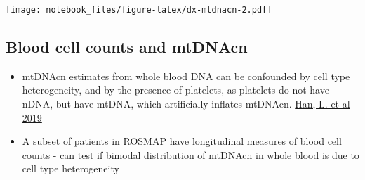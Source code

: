 \documentclass[]{book}
\newenvironment{Shaded}{\begin{snugshade}}{\end{snugshade}}
\newcommand{\DataTypeTok}[1]{\textcolor[rgb]{0.13,0.29,0.53}{#1}}
\newcommand{\DecValTok}[1]{\textcolor[rgb]{0.00,0.00,0.81}{#1}}
\newcommand{\KeywordTok}[1]{\textcolor[rgb]{0.13,0.29,0.53}{\textbf{#1}}}
\newcommand{\NormalTok}[1]{#1}
\newcommand{\OperatorTok}[1]{\textcolor[rgb]{0.81,0.36,0.00}{\textbf{#1}}}
\newcommand{\StringTok}[1]{\textcolor[rgb]{0.31,0.60,0.02}{#1}}
\providecommand{\tightlist}{%
  \setlength{\itemsep}{0pt}\setlength{\parskip}{0pt}}
\begin{document}
\begin{Shaded}
\end{Shaded}

\texttt{[image: notebook\_files/figure-latex/dx-mtdnacn-2.pdf]}

\hypertarget{blood-cell-counts-and-mtdnacn}{%
\subsection{Blood cell counts and mtDNAcn}\label{blood-cell-counts-and-mtdnacn}}

\begin{itemize}
\tightlist
\item
  mtDNAcn estimates from whole blood DNA can be confounded by cell type heterogeneity, and by the presence of platelets, as platelets do not have nDNA, but have mtDNA, which artificially inflates mtDNAcn. \href{https://dx.doi.org/10.1016/j.psyneuen.2019.04.004}{Han, L. et al 2019}
\item
  A subset of patients in ROSMAP have longitudinal measures of blood cell counts - can test if bimodal distribution of mtDNAcn in whole blood is due to cell type heterogeneity
\end{itemize}
\end{document}
